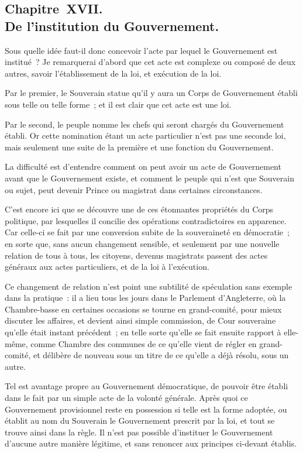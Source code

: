 \documentclass[french,twoside]{book} %
\begin{document}
\subsection[{Chapitre XVII. De l’institution du Gouvernement.}]{Chapitre XVII. \\
De l’institution du Gouvernement.}
\noindent Sous quelle idée faut-il donc concevoir l’acte par lequel le Gouvernement est institué ? Je remarquerai d’abord que cet acte est complexe ou composé de deux autres, savoir l’établissement de la loi, et exécution de la loi.\par
Par le premier, le Souverain statue qu’il y aura un Corps de Gouvernement établi sous telle ou telle forme ; et il est clair que cet acte est une loi.\par
Par le second, le peuple nomme les chefs qui seront chargés du Gouvernement établi. Or cette nomination étant un acte particulier n’est pas une seconde loi, mais seulement une suite de la première et une fonction du Gouvernement.\par
La difficulté est d’entendre comment on peut avoir un acte de Gouvernement avant que le Gouvernement existe, et comment le peuple qui n’est que Souverain ou sujet, peut devenir Prince ou magistrat dans certaines circonstances.\par
C’est encore ici que se découvre une de ces étonnantes propriétés du Corps politique, par lesquelles il concilie des opérations contradictoires en apparence. Car celle-ci se fait par une conversion subite de la souveraineté en démocratie ; en sorte que, sans aucun changement sensible, et seulement par une nouvelle relation de tous à tous, les citoyens, devenus magistrats passent des actes généraux aux actes particuliers, et de la loi à l’exécution.\par
Ce changement de relation n’est point une subtilité de spéculation sans exemple dans la pratique : il a lieu tous les jours dans le Parlement d’Angleterre, où la Chambre-basse en certaines occasions se tourne en grand-comité, pour mieux discuter les affaires, et devient ainsi simple commission, de Cour souveraine qu’elle était instant précédent ; en telle sorte qu’elle se fait ensuite rapport à elle-même, comme Chambre des communes de ce qu’elle vient de régler en grand-comité, et délibère de nouveau sous un titre de ce qu’elle a déjà résolu, sous un autre.\par
Tel est avantage propre au Gouvernement démocratique, de pouvoir être établi dans le fait par un simple acte de la volonté générale. Après quoi ce Gouvernement provisionnel reste en possession si telle est la forme adoptée, ou établit au nom du Souverain le Gouvernement prescrit par la loi, et tout se trouve ainsi dans la règle. Il n’est pas possible d’instituer le Gouvernement d’aucune autre manière légitime, et sans renoncer aux principes ci-devant établis.
\end{document}
